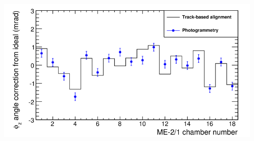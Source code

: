 \documentclass[compress]{beamer}
\begin{document}
\begin{frame}
\begin{columns}
\hfill \includegraphics[width=0.95\linewidth]{data_correlations.png}
\end{columns}
\end{frame}
\end{document}
